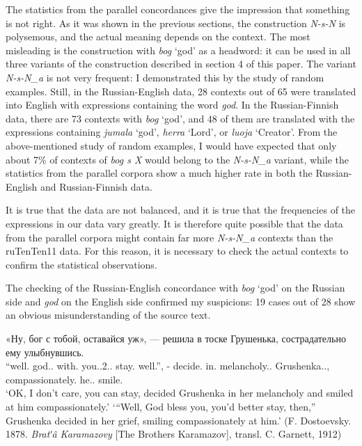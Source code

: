 \documentclass[output=paper]{langscibook}
\begin{document}
The statistics from the parallel concordances give the impression that something is not right. As it was shown in the previous sections, the construction \textit{N-s-N} is polysemous, and the actual meaning depends on the context. The most misleading is the construction with \textit{bog} ‘god’ as a headword: it can be used in all three variants of the construction described in section 4 of this paper. The variant \textit{N-s-N\_a} is not very frequent: I demonstrated this by the study of random examples. Still, in the Russian-English data, 28 contexts out of 65 were translated into English with expressions containing the word \textit{god}. In the Russian-Finnish data, there are 73 contexts with \textit{bog} ‘god’, and 48 of them are translated with the expressions containing \textit{jumala} ‘god’, \textit{herra} ‘Lord’, or \textit{luoja} ‘Creator’. From the above-mentioned study of random examples, I would have expected that only about 7\% of contexts of \textit{bog s X} would belong to the \textit{N-s-N\_a} variant, while the statistics from the parallel corpora show a much higher rate in both the Russian-English and Russian-Finnish data.

It is true that the data are not balanced, and it is true that the frequencies of the expressions in our data vary greatly. It is therefore quite possible that the data from the parallel corpora might contain far more \textit{N-s-N\_a} contexts than the ruTenTen11 data. For this reason, it is necessary to check the actual contexts to confirm the statistical observations.

The checking of the Russian-English concordance with \textit{bog} ‘god’ on the Russian side and \textit{god} on the English side confirmed my suspicions: 19 cases out of 28 show an obvious misunderstanding of the source text.

\ea
\gll «Ну, бог с тобой, оставайся уж», — решила в тоске Грушенька, сострадательно ему улыбнувшись.\\
     “well.{\PTCP} god.{\NOUN}.{\NOM} with.{\PREP} you.{\PRON}.2.{\INSTR}.{\SG} stay.{\IMP} well.{\PTCP}”, - decide.{\PAST}{\F}{\SG} in.{\PREP} melancholy.{\NOUN}.{\LOC}{\SG} Grushenka.{\NOUNPROPER}.{\NOM}, compassionately.{\ADV} he.{\PRON}.{\DAT}{\SG} smile.{\GERUND}\\
\glt `OK, I don’t care, you can stay, decided Grushenka in her melancholy and smiled at him compassionately.'
\glt `“Well, God bless you, you’d better stay, then,” Grushenka decided in her grief, smiling compassionately at him.' (F. Dostoevsky. 1878. \textit{Bratʹâ Karamazovy} [The Brothers Karamazov], transl. C. Garnett, 1912)\z
\end{document}
